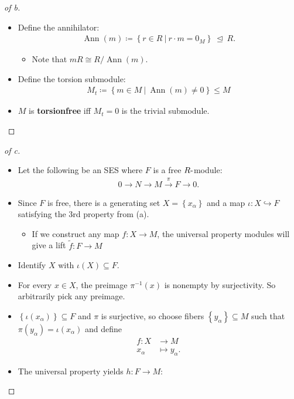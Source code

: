\begin{solution}
\begin{proof}[of b]
\envlist

\begin{itemize}
\tightlist
\item
  Define the annihilator:
  \begin{align*}
  \operatorname{Ann}(m) \coloneqq\left\{{r\in R {~\mathrel{\Big|}~}r\cdot m = 0_M}\right\} {~\trianglelefteq~}R
  .\end{align*}

  \begin{itemize}
  \tightlist
  \item
    Note that \(mR \cong R/\operatorname{Ann}(m)\).
  \end{itemize}
\item
  Define the torsion submodule:
  \begin{align*}
  M_t \coloneqq\left\{{m\in M {~\mathrel{\Big|}~}\operatorname{Ann}(m) \neq 0}\right\} \leq M
  \end{align*}
\item
  \(M\) is \textbf{torsionfree} iff \(M_t = 0\) is the trivial
  submodule.
\end{itemize}

\end{proof}

\begin{proof}[of c]

\envlist

\begin{itemize}
\item
  Let the following be an SES where \(F\) is a free
  \(R{\hbox{-}}\)module:
  \begin{align*}
  0 \to N \to M \xrightarrow{\pi} F \to 0
  .\end{align*}
\item
  Since \(F\) is free, there is a generating set
  \(X = \left\{{x_\alpha}\right\}\) and a map
  \(\iota:X\hookrightarrow F\) satisfying the 3rd property from (a).

  \begin{itemize}
  \tightlist
  \item
    If we construct any map \(f: X\to M\), the universal property
    modules will give a lift \(\tilde f: F\to M\)
  \end{itemize}
\item
  Identify \(X\) with \(\iota(X) \subseteq F\).
\item
  For every \(x\in X\), the preimage \(\pi^{-1}(x)\) is nonempty by
  surjectivity. So arbitrarily pick any preimage.
\item
  \(\left\{{\iota(x_\alpha)}\right\} \subseteq F\) and \(\pi\) is
  surjective, so choose fibers \(\left\{{y_\alpha}\right\} \subseteq M\)
  such that \(\pi(y_\alpha) = \iota(x_\alpha)\) and define
  \begin{align*}
  f: X&\to M \\
  x_\alpha &\mapsto y_\alpha
  .\end{align*}
\item
  The universal property yields \(h: F\to M\):
\end{itemize}


\end{proof}
\end{solution}
